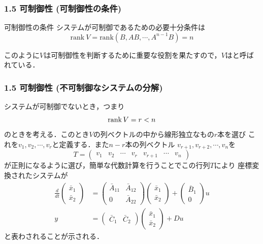 \begin{frame}[t]
\frametitle{1.5 可制御性 (可制御性の条件)}
\begin{block}{可制御性の条件}
システムが可制御であるための必要十分条件は
$$\mbox{rank}\ V = \mbox{rank} (B,AB,\cdots,A^{n-1}B) = n$$
\end{block}
このように$V$は可制御性を判断するために重要な役割を果たすので，$V$はと呼ばれている．
\end{frame}


\begin{frame}[t]
\frametitle{1.5 可制御性 (不可制御なシステムの分解)}
システムが可制御でないとき，つまり
\begin{equation}
 \mathop{\rm rank}\nolimits V = r < n
\end{equation}
のときを考える．このとき$V$の列ベクトルの中から線形独立なもの$r$本を選び
これを$v_1, v_2, \cdots, v_r$と定義する．また$n-r$本の列ベクトル
$v_{r+1}, v_{r+2}, \cdots, v_n$を
\begin{equation}
 T = \left(\begin{array}{ccccccc}
            v_1 & v_2 & \cdots & v_r & v_{r+1} & \cdots & v_n
     \end{array}\right)
\end{equation}
が正則になるように選び，簡単な代数計算を行うことでこの行列$T$により
座標変換されたシステムが
\begin{align}
 \frac{d}{dt}
  \left(\begin{array}{c}
         \bar{x}_1 \\
   \bar{x}_2
  \end{array}\right)
  &=
  \left(\begin{array}{cc}
         \bar{A}_{11} & \bar{A}_{12} \\
   0            & \bar{A}_{22}
  \end{array}\right)
  \left(\begin{array}{c}
         \bar{x}_1 \\
   \bar{x}_2
  \end{array}\right)
  +
  \left(\begin{array}{c}
         \bar{B}_1 \\
   0
  \end{array}\right)
  u \\
 y &=
  \left(\begin{array}{cc}
         \bar{C}_1 & \bar{C}_2
  \end{array}\right)
  \left(\begin{array}{c}
         \bar{x}_1 \\
   \bar{x}_2
  \end{array}\right)
  + D u
\end{align}
と表わされることが示される．
\end{frame}


